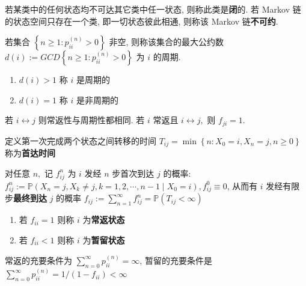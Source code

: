 \documentclass[10pt]{yerbaformat}
\begin{document}
\begin{definition}[可约]
    若某类中的任何状态均不可达其它类中任一状态, 则称此类是\textbf{闭}的. 若 Markov 链的状态空间只存在一个类, 即一切状态彼此相通, 则称该 Markov 链\textbf{不可约}.
\end{definition}

\begin{definition}[周期]
    若集合 $\left\{n \geq 1: p_{i i}^{(n)}>0\right\}$ 非空, 则称该集合的最大公约数 $d(i):=G C D\left\{n \geq 1: p_{i i}^{(n)}>0\right\}$ 为 $i$ 的周期. 
    \begin{enumerate}
        \item $d(i)>1$ 称 $i$ 是周期的
        \item $d(i)=1$ 称 $i$ 是非周期的
    \end{enumerate}
\end{definition}

\begin{lemma}
    若 $i \leftrightarrow j$ 则常返性与周期性都相同. 若 $i$ 常返且 $i \leftrightarrow j,$ 则 $f_{j i}=1 .$
\end{lemma}

\begin{definition}[首达时间]
    定义第一次完成两个状态之间转移的时间 $T_{i j}=\min \left\{n: X_{0}=i, X_{n}=j, n \geq 0\right\}$ 称为\textbf{首达时间} %
\end{definition}

\begin{definition}
    对任意 $n,$ 记 $f_{i j}^{n}$ 为 $i$ 发经 $n$ 步首次到达 $j$ 的概率: $f_{i j}^{n}:=\mathbb{P}\left(X_{n}=j, X_{k} \neq j, k=1,2, \cdots, n-1 \mid X_{0}=i\right), f_{i j}^{0} \equiv 0 $, 从而有 $i$ 发经有限步\textbf{最终到达} $j$ 的概率 $f_{i j}:=\sum_{n=1}^{\infty} f_{i j}^{n}=\mathbb{P}\left(T_{i j}<\infty\right)$
    \begin{enumerate}
        \item 若 $f_{i i}=1$ 则称 $i$ 为\textbf{常返状态}
        \item 若 $f_{i i}<1$ 则称 $i$ 为\textbf{暂留状态}
    \end{enumerate}
\end{definition}

\begin{definition}[判定定理]
    常返的充要条件为 $\sum_{n=0}^{\infty} p_{i i}^{(n)}=\infty$, 暂留的充要条件是 $\sum_{n=0}^{\infty} p_{i i}^{(n)}=1 /\left(1-f_{i i}\right)<\infty$
\end{definition}
\end{document}
